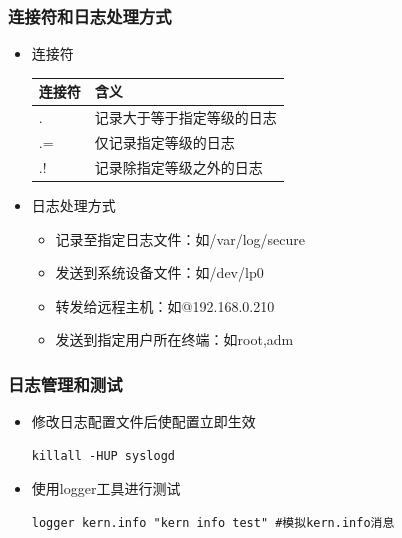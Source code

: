 \documentclass[xcolor=svgnames,presentation]{beamer}
\begin{document}
\begin{frame}
\frametitle{连接符和日志处理方式}
\label{sec-6-7}
\begin{itemize}

\item 连接符\\
\label{sec-6-7-1}%
\begin{center}
\begin{tabular}{ll}
 连接符  &  含义                        \\
\hline
 .       &  记录大于等于指定等级的日志  \\
 .=      &  仅记录指定等级的日志        \\
 .!      &  记录除指定等级之外的日志    \\
\end{tabular}
\end{center}



\item 日志处理方式
\label{sec-6-7-2}%
\begin{itemize}

\item 记录至指定日志文件：如/var/log/secure
\label{sec-6-7-2-1}%

\item 发送到系统设备文件：如/dev/lp0
\label{sec-6-7-2-2}%

\item 转发给远程主机：如@192.168.0.210
\label{sec-6-7-2-3}%

\item 发送到指定用户所在终端：如root,adm
\label{sec-6-7-2-4}%
\end{itemize} %
\end{itemize} %
\end{frame}
\begin{frame}[fragile]
\frametitle{日志管理和测试}
\label{sec-6-8}
\begin{itemize}

\item 修改日志配置文件后使配置立即生效\\
\label{sec-6-8-1}%
\begin{verbatim}
killall -HUP syslogd
\end{verbatim}

\item 使用logger工具进行测试\\
\label{sec-6-8-2}%
\begin{verbatim}
logger kern.info "kern info test" #模拟kern.info消息
\end{verbatim}
\end{itemize} %
\end{frame}
\end{document}
